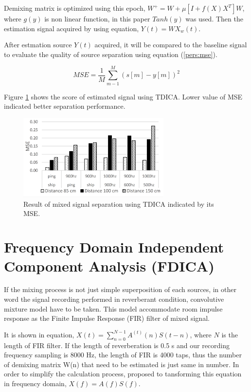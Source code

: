 \documentclass[a4paper]{jpconf}
\begin{document}
Demixing matrix is optimized using this epoch, $W^+ = W + \mu\left[I + f(X)X^T\right]W$, where $g(y)$ is non linear function, in this paper $Tanh(y)$ was used. Then the estimation signal acquired by using equation, $Y(t) = WX_w(t)$.

After estmation source $Y(t)$ acquired, it will be compared to the baseline signal to evaluate the quality of source separation using equation (\ref{pers:mse}).

\begin{equation}\label{pers:mse}
MSE = \frac{1}{M} \sum_{m-1}^M \left(s[m] - y[m]\right)^2
\end{equation}

Figure \ref{pict:msetdica} shows the score of estimated signal using TDICA. Lower value of MSE indicated better separation performance.

\begin{figure}[h]
\begin{center}
\includegraphics[width=3in]{figure2.png}
\caption{\label{pict:msetdica}Result of mixed signal separation using TDICA indicated by its MSE.}
\end{center}
\end{figure}

\section{Frequency Domain Independent Component Analysis (FDICA)}
If the mixing process is not just simple superposition of each sources, in other word the signal recording performed in reverberant condition, convolutive mixture model have to be taken. This model accommodate room impulse response as the Finite Impulse Response (FIR) filter of mixed signal.

It is shown in equation, $X(t) = \sum_{n=0}^{N-1}A^{(t)}(n)S(t-n)$, where $N$ is the length of FIR filter. If the length of reverberation is 0.5 s and our recording frequency sampling is 8000 Hz, the length of FIR is 4000 taps, thus the number of demixing matrix W(n) that need to be estimated is just same in number. In order to simplify the calculation process, \cite{6} proposed to tansforming this equation in frequency domain, $X(f)=A(f)S(f)$.
\end{document}
